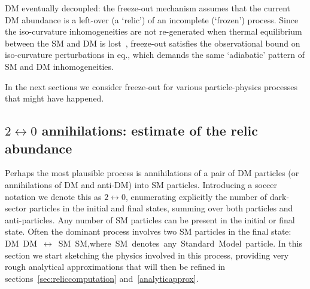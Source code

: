 DM eventually decoupled: the freeze-out mechanism assumes that the current DM abundance is a left-over (a `relic') of an incomplete (`frozen') process. 
Since the iso-curvature inhomogeneities are not re-generated when thermal equilibrium between the SM and DM 
is lost~\cite{AdiabaticDM}, freeze-out satisfies the observational bound on iso-curvature perturbations in eq., which demands the same `adiabatic' pattern of SM and DM inhomogeneities.
\label{DM cosmological abundance!iso-curvature}\label{Iso-curvature}

In the next sections we consider freeze-out for various particle-physics processes that
might have happened.


\subsection{$2\leftrightarrow 0$ annihilations: estimate of the relic abundance}\label{sec:thermalapprox}
Perhaps the most plausible process is annihilations of a pair of DM particles 
(or annihilations of DM and anti-DM) into SM particles.
Introducing a soccer notation we denote this as $2\leftrightarrow 0$, 
enumerating explicitly the number of dark-sector particles in the initial and final states,
summing over both particles and anti-particles.
Any number of SM particles can be present in the initial or final state.
Often the dominant process involves two SM particles in the final state:
\beq 
\hbox{DM DM $\leftrightarrow$ SM SM},\qquad\hbox{where SM denotes any Standard Model particle}.
\eeq
In this section we start sketching the physics involved in this process, providing very rough analytical approximations
that will then be refined in sections~\ref{sec:reliccomputation} and~\ref{analyticapprox}.

\medskip


